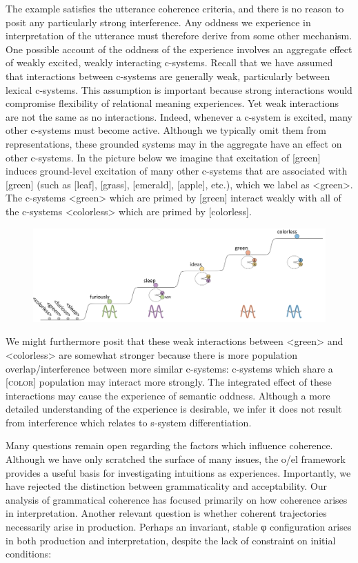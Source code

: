   The example satisfies the utterance coherence criteria, and there is no reason to posit any particularly strong interference. Any oddness we experience in interpretation of the utterance must therefore derive from some other mechanism. One possible account of the oddness of the experience involves an aggregate effect of weakly excited, weakly interacting c-systems. Recall that we have assumed that interactions between c-systems are generally weak, particularly between lexical c-systems. This assumption is important because strong interactions would compromise flexibility of relational meaning experiences. Yet weak interactions are not the same as no interactions. Indeed, whenever a c-system is excited, many other c-systems must become active. Although we typically omit them from representations, these grounded systems may in the aggregate have an effect on other c-systems. In the picture below we imagine that excitation of [green] induces ground-level excitation of many other c-systems that are associated with [green] (such as [leaf], [grass], [emerald], [apple], etc.), which we label as <green>. The c-systems <green> which are primed by [green] interact weakly with all of the c-systems <colorless> which are primed by [colorless]. 

  
\begin{figure}
\includegraphics[width=\textwidth]{figures/Tilsen-img134.png}
\caption{\missingcaption}
\label{fig:6:15}
\end{figure}
 

  We might furthermore posit that these weak interactions between <green> and <colorless> are somewhat stronger because there is more population overlap/interference between more similar c-systems: c-systems which share a [\textsc{color}] population may interact more strongly. The integrated effect of these interactions may cause the experience of semantic oddness. Although a more detailed understanding of the experience is desirable, we infer it does not result from interference which relates to s-system differentiation.

  Many questions remain open regarding the factors which influence coherence. Although we have only scratched the surface of many issues, the o/el framework provides a useful basis for investigating intuitions as experiences. Importantly, we have rejected the distinction between grammaticality and acceptability. Our analysis of grammatical coherence has focused primarily on how coherence arises in interpretation. Another relevant question is whether coherent trajectories necessarily arise in production. Perhaps an invariant, stable φ configuration arises in both production and interpretation, despite the lack of constraint on initial conditions:

